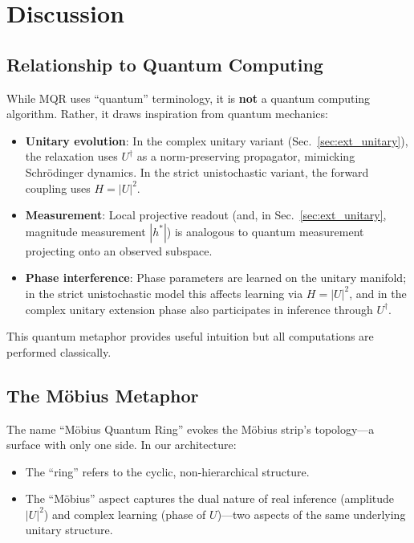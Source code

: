 \documentclass[11pt,a4paper]{article}
\begin{document}
\section{Discussion}
\label{sec:discussion}

\subsection{Relationship to Quantum Computing}

While MQR uses ``quantum'' terminology, it is \textbf{not} a quantum computing algorithm. Rather, it draws inspiration from quantum mechanics:

\begin{itemize}
    \item \textbf{Unitary evolution}: In the complex unitary variant (Sec.~\ref{sec:ext_unitary}), the relaxation uses $U^\dagger$ as a norm-preserving propagator, mimicking Schrödinger dynamics. In the strict unistochastic variant, the forward coupling uses $H=|U|^2$.
    \item \textbf{Measurement}: Local projective readout (and, in Sec.~\ref{sec:ext_unitary}, magnitude measurement $|h^*|$) is analogous to quantum measurement projecting onto an observed subspace.
    \item \textbf{Phase interference}: Phase parameters are learned on the unitary manifold; in the strict unistochastic model this affects learning via $H=|U|^2$, and in the complex unitary extension phase also participates in inference through $U^\dagger$.
\end{itemize}

This quantum metaphor provides useful intuition but all computations are performed classically.

\subsection{The Möbius Metaphor}

The name ``Möbius Quantum Ring'' evokes the Möbius strip's topology---a surface with only one side. In our architecture:

\begin{itemize}
    \item The ``ring'' refers to the cyclic, non-hierarchical structure.
    \item The ``Möbius'' aspect captures the dual nature of real inference (amplitude $|U|^2$) and complex learning (phase of $U$)---two aspects of the same underlying unitary structure.
\end{itemize}
\end{document}

